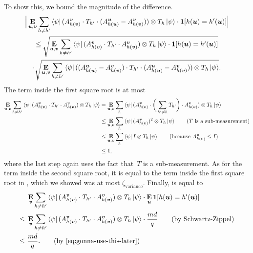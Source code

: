 To show this, we bound the magnitude of the difference.
\begin{multline*}
\Big|\mathop{\bf E\/}_{\boldsymbol{u},\boldsymbol{v}} \sum_{h \neq h'} \bra{\psi}  (A^{\boldsymbol{v}}_{h(\boldsymbol{v})} \cdot T_{h'} \cdot (A^{\boldsymbol{u}}_{h(\boldsymbol{u})} - A^{\boldsymbol{v}}_{h(\boldsymbol{v})})) \otimes T_h \ket{\psi} \cdot \boldsymbol{1}[h(\boldsymbol{u}) = h'(\boldsymbol{u})]\Big|\\
\leq
\sqrt{\mathop{\bf E\/}_{\boldsymbol{u},\boldsymbol{v}} \sum_{h \neq h'} \bra{\psi}  (A^{\boldsymbol{v}}_{h(\boldsymbol{v})} \cdot T_{h'} \cdot A^{\boldsymbol{v}}_{h(\boldsymbol{v})}) \otimes T_h\ket{\psi} \cdot \boldsymbol{1}[h(\boldsymbol{u}) = h'(\boldsymbol{u})]}\\
\cdot \sqrt{\mathop{\bf E\/}_{\boldsymbol{u},\boldsymbol{v}} \sum_{h \neq h'} \bra{\psi} ( (A^{\boldsymbol{u}}_{h(\boldsymbol{u})} - A^{\boldsymbol{v}}_{h(\boldsymbol{v})}) \cdot T_{h'} \cdot (A^{\boldsymbol{u}}_{h(\boldsymbol{u})} - A^{\boldsymbol{v}}_{h(\boldsymbol{v})}))\otimes T_h\ket{\psi}}.
\end{multline*}
The term inside the first square root is at most
\begin{align}
\E_{\bu,\bv} \sum_{h \neq h'} \bra{\psi}  (A^{\bv}_{h(\bv)} \cdot T_{h'} \cdot A^{\bv}_{h(\bv)})\otimes T_h\ket{\psi}
& = \E_{\bu,\bv} \sum_{h} \bra{\psi}  (A^{\bv}_{h(\bv)} \cdot \bigg(\sum_{h' \neq h} T_{h'}\bigg) \cdot A^{\bv}_{h(\bv)}) \otimes T_h\ket{\psi}\\
& \leq \E_{\bu,\bv} \sum_{h} \bra{\psi}   (A^{\bv}_{h(\bv)})^2\otimes T_h\ket{\psi}\tag{$T$ is a sub-measurement}\\
& \leq \E_{\bu,\bv} \sum_{h} \bra{\psi}   I \otimes T_h\ket{\psi}\tag{because $A^{\bv}_{h(\bv)} \leq I$}\\
& \leq 1, \label{eq:gonna-use-this-later}
\end{align}
where the last step again uses the fact that~$T$ is a sub-measurement.
As for the term inside the second square root, it is equal to the term inside the first square root in ,
which we showed was at most $\zeta_{\mathrm{variance}}$.
Finally,  is equal to
\begin{align*}
&\E_{\bv} \sum_{h \neq h'} \bra{\psi} (A^{\bv}_{h(\bv)} \cdot T_{h'} \cdot A^{\bv}_{h(\bv)}) \otimes T_h\ket{\psi} \cdot \E_{\bu}\bone[h(\bu) = h'(\bu)]\\
\leq~& \E_{\bv} \sum_{h \neq h'} \bra{\psi} (A^{\bv}_{h(\bv)} \cdot T_{h'} \cdot A^{\bv}_{h(\bv)}) \otimes T_h \ket{\psi} \cdot \frac{md}{q} \tag{by Schwartz-Zippel}\\
\leq~& \frac{md}{q}. \tag{by \Cref{eq:gonna-use-this-later}}
\end{align*}

